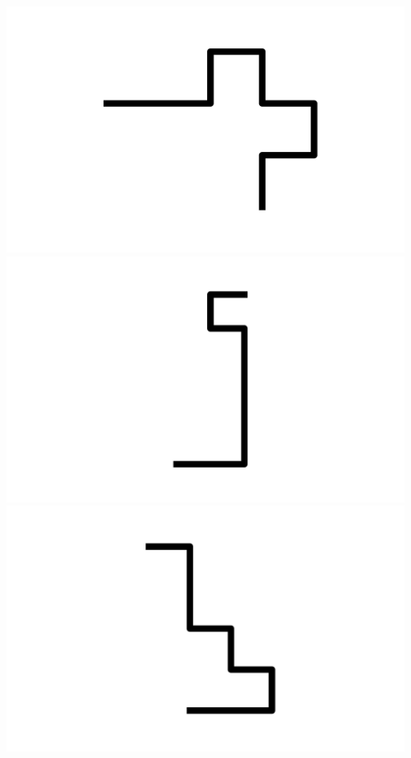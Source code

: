 \documentclass[]{report}
\begin{document}
\includegraphics[scale=.1]{pictures/21/state_cluster_shapes_181.pdf} 
\includegraphics[scale=.1]{pictures/21/state_cluster_shapes_182.pdf} 
\includegraphics[scale=.1]{pictures/21/state_cluster_shapes_183.pdf} 
\end{document}
